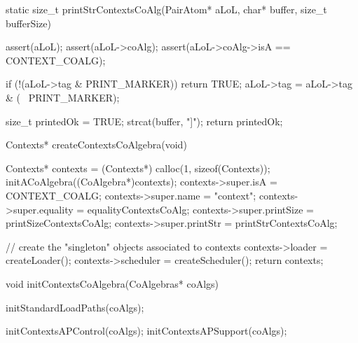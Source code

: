 static size_t printStrContextsCoAlg(PairAtom* aLoL,
                                   char* buffer, size_t bufferSize) {
  assert(aLoL);
  assert(aLoL->coAlg);
  assert(aLoL->coAlg->isA == CONTEXT_COALG);

  if (!(aLoL->tag & PRINT_MARKER)) return TRUE;
  aLoL->tag = aLoL->tag & (~ PRINT_MARKER);

  size_t printedOk = TRUE;
  strcat(buffer, "\n[");
  strcat(buffer, aLoL->context->name);
  strcat(buffer, "[ ");
  lolPrintStr(printedOk, aLoL->context->data,
              "d:( ", ") ", buffer, bufferSize);
  lolPrintStr(printedOk, aLoL->context->command,
              "c:( ", ") ", buffer, bufferSize);
  lolPrintStr(printedOk, aLoL->context->process,
              "p:( ", ") ", buffer, bufferSize);
  lolPrintStr(printedOk, aLoL->context->messages,
              "m:( ", ") ", buffer, bufferSize);
  lolPrintStr(printedOk, aLoL->context->listeners,
              "l:( ", ") ", buffer, bufferSize);
  strcat(buffer, " ]]\n");
  return printedOk;
}

Contexts* createContextsCoAlgebra(void) {
  Contexts* contexts  = (Contexts*) calloc(1, sizeof(Contexts));
  initACoAlgebra((CoAlgebra*)contexts);
  contexts->super.isA       = CONTEXT_COALG;
  contexts->super.name      = "context";
  contexts->super.equality  = equalityContextsCoAlg;
  contexts->super.printSize = printSizeContextsCoAlg;
  contexts->super.printStr  = printStrContextsCoAlg;

  // create the "singleton" objects associated to contexts
  contexts->loader          = createLoader();
  contexts->scheduler       = createScheduler();
  return contexts;
}

void initContextsCoAlgebra(CoAlgebras* coAlgs) {
  initStandardLoadPaths(coAlgs);

  initContextsAPControl(coAlgs);
  initContextsAPSupport(coAlgs);
}
\stoptyping